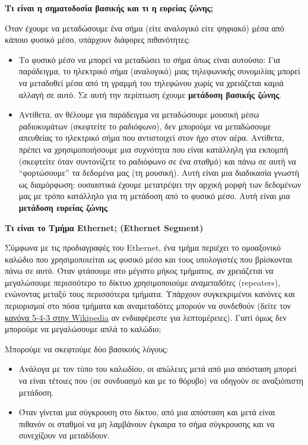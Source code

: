 \begin{inthebox}
\textbf{Τι είναι η σηματοδοσία βασικής και τι η ευρείας ζώνης;}

Όταν έχουμε να μεταδώσουμε ένα σήμα (είτε αναλογικό είτε ψηφιακό) μέσα από κάποιο φυσικό μέσο, υπάρχουν διάφορες πιθανότητες:

\begin{itemize}
\item Το φυσικό μέσο να μπορεί να μεταδώσει το σήμα όπως είναι αυτούσιο: Για παράδειγμα, το ηλεκτρικό σήμα (αναλογικό) μιας τηλεφωνικής συνομιλίας μπορεί να μεταδοθεί μέσα από τη γραμμή του τηλεφώνου χωρίς να χρειάζεται καμιά αλλαγή σε αυτό. Σε αυτή την περίπτωση έχουμε \textbf{μετάδοση βασικής ζώνης}.
\item Αντίθετα, αν θέλουμε για παράδειγμα να μεταδώσουμε μουσική μέσω ραδιοκυμάτων (σκεφτείτε το ραδιόφωνο), δεν μπορούμε να μεταδώσουμε απευθείας το ηλεκτρικό σήμα που αντιστοιχεί στον ήχο στον αέρα. Αντίθετα, πρέπει να χρησιμοποιήσουμε μια συχνότητα που είναι κατάλληλη για εκπομπή (σκεφτείτε όταν συντονίζετε το ραδιόφωνο σε ένα σταθμό) και πάνω σε αυτή να ``φορτώσουμε'' τα δεδομένα μας (τη μουσική). Αυτή είναι μια διαδικασία γνωστή ως διαμόρφωση: ουσιαστικά έχουμε μετατρέψει την αρχική μορφή των δεδομένων μας με τρόπο κατάλληλο για τη μετάδοση από το φυσικό μέσο. Αυτή είναι μια \textbf{μετάδοση ευρείας ζώνης}.
\end{itemize}

\textbf{Τι είναι το Τμήμα Ethernet; (Ethernet Segment)}

Σύμφωνα με τις προδιαγραφές του Ethernet, ένα τμήμα περιέχει το ομοαξονικό καλώδιο που χρησιμοποιείται ως φυσικό μέσο και τους υπολογιστές που βρίσκονται πάνω σε αυτό. Όταν φτάσουμε στο μέγιστο μήκος τμήματος, αν χρειάζεται να μεγαλώσουμε περισσότερο το δίκτυο χρησιμοποιούμε \emph{αναμεταδότες} (repeaters), ενώνοντας μεταξύ τους περισσότερα τμήματα. Υπάρχουν συγκεκριμένοι κανόνες και περιορισμοί στο πόσα τμήματα και αναμεταδότες μπορούν να συνδεθούν (δείτε τον \href{https://en.wikipedia.org/wiki/5-4-3_rule}{κανόνα 5-4-3 στην Wikipedia} αν ενδιαφέρεστε για λεπτομέρειες). Γιατί όμως δεν μπορούμε να μεγαλώσουμε απλά το καλώδιο;

Μπορούμε να σκεφτούμε δύο βασικούς λόγους:

\begin{itemize}
\item Ανάλογα με τον τύπο του καλωδίου, οι απώλειες μετά από μια απόσταση μπορεί να είναι τέτοιες που (σε συνδυασμό και με το θόρυβο) να οδηγούν σε αναξιόπιστη μετάδοση.
\item Όταν γίνεται μια σύγκρουση στο δίκτυο, από μια απόσταση και μετά είναι πιθανόν οι σταθμοί να μη λαμβάνουν έγκαιρα το σήμα σύγκρουσης και να συνεχίζουν να μεταδίδουν.
\end{itemize}
\end{inthebox}

